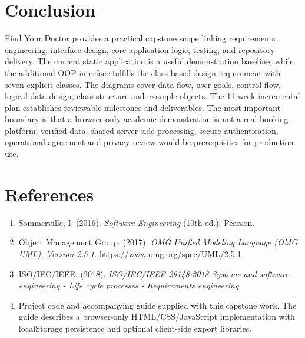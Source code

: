 \documentclass[11pt,a4paper]{article}
\begin{document}
\section{Conclusion}
Find Your Doctor provides a practical capstone scope linking requirements engineering, interface design, core application logic, testing, and repository delivery. The current static application is a useful demonstration baseline, while the additional OOP interface fulfills the class-based design requirement with seven explicit classes. The diagrams cover data flow, user goals, control flow, logical data design, class structure and example objects. The 11-week incremental plan establishes reviewable milestones and deliverables. The most important boundary is that a browser-only academic demonstration is not a real booking platform: verified data, shared server-side processing, secure authentication, operational agreement and privacy review would be prerequisites for production use.

\section{References}
\begin{enumerate}
  \item Sommerville, I. (2016). \textit{Software Engineering} (10th ed.). Pearson.
  \item Object Management Group. (2017). \textit{OMG Unified Modeling Language (OMG UML), Version 2.5.1}. https://www.omg.org/spec/UML/2.5.1
  \item ISO/IEC/IEEE. (2018). \textit{ISO/IEC/IEEE 29148:2018 Systems and software engineering - Life cycle processes - Requirements engineering}.
  \item Project code and accompanying guide supplied with this capstone work. The guide describes a browser-only HTML/CSS/JavaScript implementation with localStorage persistence and optional client-side export libraries.
\end{enumerate}

\appendix
\end{document}
